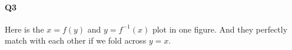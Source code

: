 \documentclass[11pt]{article}
\begin{document}
\paragraph{Q3}
Here is the $x=f(y)$ and $y=f^{-1}(x)$ plot in one figure. And they perfectly match with each other if we fold across $y=x$.
\begin{figure}[H]
	\centering
\end{figure}
\end{document}
